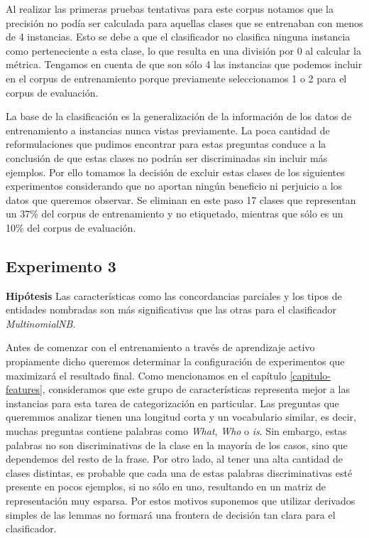 Al realizar las primeras pruebas tentativas para este corpus notamos que la precisión no podía ser calculada para aquellas clases que se entrenaban con menos de 4 instancias. Esto se debe a que el clasificador no clasifica ninguna instancia como perteneciente a esta clase, lo que resulta en una división por 0 al calcular la métrica. Tengamos en cuenta de que son sólo 4 las instancias que podemos incluir en el corpus de entrenamiento porque previamente seleccionamos 1 o 2 para el corpus de evaluación.

La base de la clasificación es la generalización de la información de los datos de entrenamiento a instancias nunca vistas previamente. La poca cantidad de reformulaciones que pudimos encontrar para estas preguntas conduce a la conclusión de que estas clases no podrán ser discriminadas sin incluir más ejemplos. Por ello tomamos la decisión de excluir estas clases de los siguientes experimentos considerando que no aportan ningún beneficio ni perjuicio a los datos que queremos observar. Se eliminan en este paso 17 clases que representan un 37\% del corpus de entrenamiento y no etiquetado, mientras que sólo es un 10\% del corpus de evaluación.


\subsection{Experimento 3}
\vspace{3 mm}
\textbf{Hipótesis} Las características como las concordancias parciales y los tipos de entidades nombradas son más significativas que las otras para el clasificador \textit{MultinomialNB}.
\vspace{3 mm}

Antes de comenzar con el entrenamiento a través de aprendizaje activo propiamente dicho queremos determinar la configuración de experimentos que maximizará el resultado final. Como mencionamos en el capítulo \ref{capitulo-features}, consideramos que este grupo de características representa mejor a las instancias para esta tarea de categorización en particular. Las preguntas que queremmos analizar tienen una longitud corta y un vocabulario similar, es decir, muchas preguntas contiene palabras como \textit{What}, \textit{Who} o \textit{is}. Sin embargo, estas palabras no son discriminativas de la clase en la mayoría de los casos, sino que dependemos del resto de la frase. Por otro lado, al tener una alta cantidad de clases distintas, es probable que cada una de estas palabras discriminativas esté presente en pocos ejemplos, si no sólo en uno, resultando en un matriz de representación muy esparsa. Por estos motivos suponemos que utilizar derivados simples de las lemmas no formará una frontera de decisión tan clara para el clasificador.


